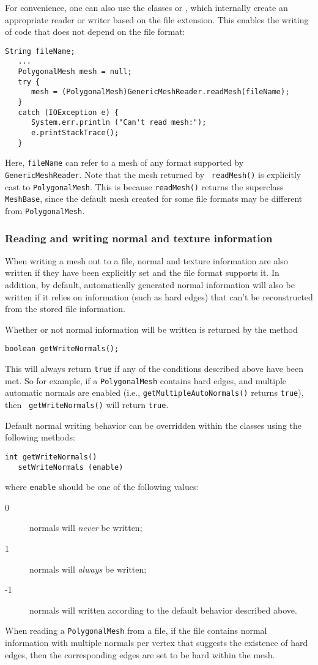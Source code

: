 For convenience, one can also use the classes
 or
, which internally
create an appropriate reader or writer based on the file
extension. This enables the writing of code
that does not depend on the file format:
%
\begin{lstlisting}[]
   String fileName;
   ...
   PolygonalMesh mesh = null;
   try {
      mesh = (PolygonalMesh)GenericMeshReader.readMesh(fileName);
   }
   catch (IOException e) {
      System.err.println ("Can't read mesh:");
      e.printStackTrace();
   }
\end{lstlisting}
%
Here, {\tt fileName} can refer to a mesh of any format supported by
{\tt GenericMeshReader}. Note that the mesh returned by {\tt
readMesh()} is explicitly cast to {\tt PolygonalMesh}.  This is
because {\tt readMesh()} returns the superclass {\tt MeshBase}, since
the default mesh created for some file formats may be different from
{\tt PolygonalMesh}.

\subsubsection{Reading and writing normal and texture information}

When writing a mesh out to a file, normal and texture information are
also written if they have been explicitly set and the file format
supports it. In addition, by default, automatically generated normal
information will also be written if it relies on information (such as
hard edges) that can't be reconstructed from the stored file
information.

Whether or not normal information will be written is returned by the
method
%
\begin{lstlisting}[]
   boolean getWriteNormals();
\end{lstlisting}
%
This will always return {\tt true} if any of the conditions described
above have been met.  So for example, if a {\tt PolygonalMesh}
contains hard edges, and multiple automatic normals are enabled (i.e.,
{\tt getMultipleAutoNormals()} returns {\tt true}), then {\tt
getWriteNormals()} will return {\tt true}.

Default normal writing behavior can be overridden within 
the  classes
using the following methods:
%
\begin{lstlisting}[]
   int getWriteNormals()
   setWriteNormals (enable)
\end{lstlisting}
%
where {\tt enable} should be one of the following values:
\begin{description}
\item[ 0] normals will {\it never} be written;
\item[ 1] normals will {\it always} be written;
\item[-1] normals will written according to the default behavior 
described above.
\end{description}

When reading a {\tt PolygonalMesh} from a file, if the file contains
normal information with multiple normals per vertex that suggests the
existence of hard edges, then the corresponding edges are set to be
hard within the mesh.
